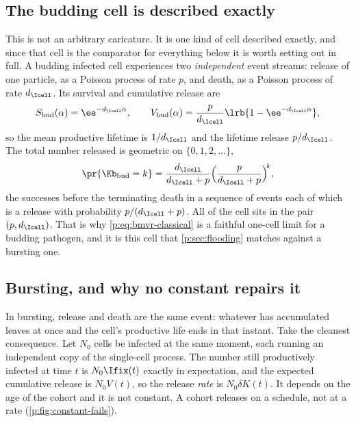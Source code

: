 \subsection{The budding cell is described exactly}
\label{p:sec:budding}

This is not an arbitrary caricature. It is one kind of cell described
exactly, and since that cell is the comparator for everything below it is
worth setting out in full. A budding infected cell experiences two
\emph{independent} event streams: release of one particle, as a Poisson
process of rate $p$, and death, as a Poisson process of rate $d_{\Icell}$.
Its survival and cumulative release are
\begin{equation}
S_{\rm bud}(\alpha)=\ee^{-d_{\Icell}\alpha},\qquad
V_{\rm bud}(\alpha)=\frac{p}{d_{\Icell}}\lrb{1-\ee^{-d_{\Icell}\alpha}},
\label{p:eq:bud-cell}
\end{equation}
so the mean productive lifetime is $1/d_{\Icell}$ and the lifetime release
$p/d_{\Icell}$. The total number released is geometric on
$\{0,1,2,\ldots\}$,
\begin{equation}
\pr{\Kb_{\rm bud}=k}=\frac{d_{\Icell}}{d_{\Icell}+p}
\Bigl(\frac{p}{d_{\Icell}+p}\Bigr)^{\!k},
\label{p:eq:bud-geom}
\end{equation}
the successes before the terminating death in a sequence of events each of
which is a release with probability $p/(d_{\Icell}+p)$. All of the cell sits
in the pair $(p,d_{\Icell})$. That is why \cref{p:eq:bmvr-classical} is a
faithful one-cell limit for a budding pathogen, and it is this cell that
\cref{p:sec:flooding} matches against a bursting one.

\subsection{Bursting, and why no constant repairs it}
\label{p:sec:obstruction}

In bursting, release and death are the same event: whatever has accumulated
leaves at once and the cell's productive life ends in that instant. Take the
cleanest consequence. Let $N_0$ cells be infected at the same moment, each
running an independent copy of the single-cell process. The number still
productively infected at time $t$ is $N_0\Ifix(t)$ exactly in expectation,
and the expected cumulative release is $N_0V(t)$, so the release
\emph{rate} is $N_0\delta K(t)$. It depends on the age of the cohort and it
is not constant. A cohort releases on a schedule, not at a rate
(\cref{p:fig:constant-fails}).

